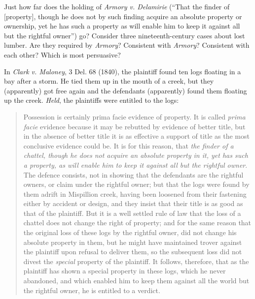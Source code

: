 
Just how far does the holding of \textit{Armory v. Delamirie} (``That the finder
of [property], though he does not by such finding acquire an absolute property
or ownership, yet he has such a property as will enable him to keep it against
all but the rightful owner'') go? Consider three nineteenth-century cases about
lost lumber. Are they required by \textit{Armory}? Consistent with
\textit{Armory}? Consistent with each other? Which is most persuasive?

In \textit{Clark v. Maloney}, 3 Del. 68 (1840), the plaintiff found ten logs
floating in a bay after a storm. He tied them up in the mouth of a creek, but
they (apparently) got free again and the defendants (apparently) found them
floating up the creek. \textit{Held}, the plaintiffs were entitled to the logs:
\begin{quote}
Possession is certainly prima facie evidence of property. It is called
\textit{prima facie} evidence because it may be rebutted by evidence of better
title, but in the absence of better title it is as effective a support of title
as the most conclusive evidence could be. It is for this reason, that
\textit{the finder of a chattel, though he does not acquire an absolute
property in it, yet has such a property, as will enable him to keep it against
all but the rightful owner}. The defence consists, not in showing that the
defendants are the rightful owners, or claim under the rightful owner; but that
the logs were found by them adrift in Mispillion creek, having been loosened
from their fastening either by accident or design, and they insist that their
title is as good as that\textbf{\textit{} }of the plaintiff. But it is a well
settled rule of law that the loss of a chattel does not change the right of
property; and for the same reason that the original loss of these logs by the
rightful owner, did not change his absolute property in them, but he might have
maintained trover against the plaintiff upon refusal to deliver them, so the
subsequent loss did not divest the \textit{special} property of the plaintiff.
It follows, therefore, that as the plaintiff has shown a special property in
these logs, which he never abandoned, and which enabled him to keep them
against all the world but the rightful owner, he is entitled to a verdict.
\end{quote}

